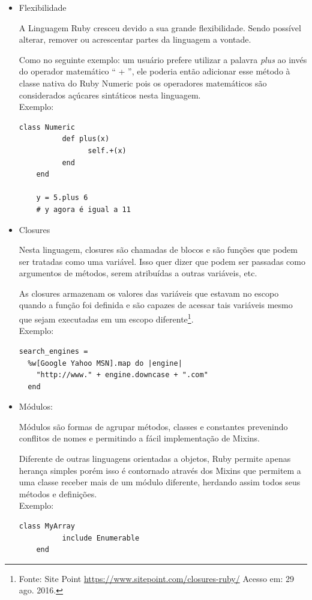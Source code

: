 \begin{itemize}
\item{Flexibilidade}
    \par A Linguagem Ruby cresceu devido a sua grande flexibilidade. Sendo possível alterar, remover ou acrescentar partes da linguagem a vontade.
    \par Como no seguinte exemplo: um usuário prefere utilizar a palavra \emph{plus} ao invés do operador matemático `` + '', ele poderia então adicionar esse método à classe nativa do Ruby Numeric pois os operadores matemáticos são considerados açúcares sintáticos nesta linguagem.
\\Exemplo:
\begin{lstlisting}[frame=single]
class Numeric
          def plus(x)
                self.+(x)
          end
    end

    y = 5.plus 6
    # y agora é igual a 11
\end{lstlisting}
\item{Closures}
\par Nesta linguagem, closures são chamadas de blocos e são funções que podem ser tratadas como uma variável. Isso quer dizer que podem ser passadas como argumentos de métodos, serem atribuídas a outras variáveis, etc.
\par As closures armazenam os valores das variáveis que estavam no escopo quando a função foi definida e são capazes de acessar tais variáveis mesmo que sejam executadas em um escopo diferente\footnote{Fonte: Site Point \url{https://www.sitepoint.com/closures-ruby/} Acesso em: 29 ago. 2016.}.
\\
Exemplo:
\begin{lstlisting}[frame=single]
search_engines =
  %w[Google Yahoo MSN].map do |engine|
    "http://www." + engine.downcase + ".com"
  end
\end{lstlisting}
\item{Módulos:}
\par Módulos são formas de agrupar métodos, classes e constantes prevenindo conflitos de nomes e permitindo a fácil implementação de Mixins.
\par Diferente de outras linguagens orientadas a objetos, Ruby permite apenas herança simples porém isso é contornado através dos Mixins que permitem a uma classe receber mais de um módulo diferente, herdando assim todos seus métodos e definições.
\\Exemplo:
\begin{lstlisting}[frame=single]
class MyArray
          include Enumerable
    end
\end{lstlisting}

\end{itemize}
